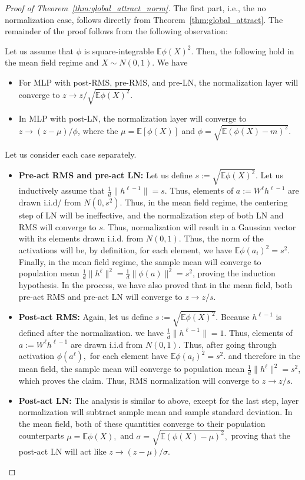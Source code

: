 \documentclass[twoside]{article}
\newcommand{\E}{\mathbb{E}}
\theoremstyle{definition}
\begin{document}
\begin{proof}[Proof of Theorem~\ref{thm:global_attract_norm}]
The first part, i.e., the no normalization case, follows directly from Theorem~\ref{thm:global_attract}. The remainder of the proof follows from the following observation:

Let us assume that $\phi$ is square-integrable $\E \phi(X)^2$. Then, the following hold in the mean field regime and $X\sim N(0,1).$ We have 
\begin{itemize}
    \item For MLP with post-RMS, pre-RMS, and pre-LN, the normalization layer will converge to  $z\to z/\sqrt{\E \phi(X)^2}$.
    \item In MLP with post-LN, the normalization layer will converge to $z \to  (z-\mu)/\phi$, where the $\mu = \E[\phi(X)]$ and $\phi = \sqrt{\E (\phi(X) - m)^2 }.$ 
\end{itemize}

Let us consider each case separately.

\begin{itemize}
    \item \textbf{Pre-act RMS and pre-act LN:} 
 Let us define $s:= \sqrt{\E \phi(X)^2}.$ Let us inductively assume that $\frac1d \|h^{\ell-1}\| = s.$ Thus, elements of $a:= W^\ell h^{\ell-1}$ are drawn i.i.d/ from $N(0,s^2).$ Thus, in the mean field regime, the centering step of LN will be ineffective, and the normalization step of both LN and RMS will converge to $s.$ Thus, normalization will result in a Gaussian vector with its elements drawn i.i.d. from $N(0,1).$ Thus, the norm of the activations will be, by definition, for each element, we have $\E \phi(a_i)^2 = s^2.$ Finally, in the mean field regime, the sample mean will converge to population mean $\frac1d\|h^\ell\|^2 = \frac1d\|\phi(a)\|^2 = s^2 $, proving the induction hypothesis. In the process, we have also proved that in the mean field, both pre-act RMS and pre-act LN will converge to $z\to z/ s.$

\item \textbf{Post-act RMS:} Again, let us define $s:= \sqrt{\E \phi(X)^2}.$ Because $h^{\ell-1}$ is defined after the normalization. we have $\frac1d \|h^{\ell-1}\| = 1.$ Thus, elements of $a:= W^\ell h^{\ell-1}$ are drawn i.i.d from $N(0,1).$ Thus, after going through activation $\phi(a^\ell),$ for each element have $\E \phi(a_i)^2 = s^2.$ and therefore in the mean field, the sample mean will converge to population mean $\frac1d\|h^\ell\|^2 = s^2 $, which proves the claim. Thus, RMS normalization will converge to $z \to z/ s.$
    \item \textbf{Post-act LN:} The analysis is similar to above, except for the last step, layer normalization will subtract sample mean and sample standard deviation. In the mean field, both of these quantities converge to their population counterparts $\mu = \E \phi(X),$ and $\sigma = \sqrt{\E (\phi(X) - \mu)^2 },$ proving that the post-act LN will act like $z \to  (z-\mu)/\sigma.$ 
\end{itemize}


\end{proof}
\end{document}
